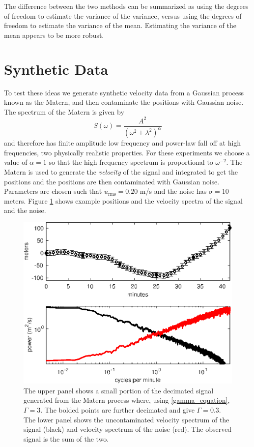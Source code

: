 \documentclass[twocol]{ametsoc}
\begin{document}
The difference between the two methods can be summarized as using the degrees of freedom to estimate the variance of the variance, versus using the degrees of freedom to estimate the variance of the mean. Estimating the variance of the mean appears to be more robust.

%
\section{Synthetic Data}
%

To test these ideas we generate synthetic velocity data from a Gaussian process known as the Matern, and then contaminate the positions with Gaussian noise. The spectrum of the Matern is given by
\begin{equation}
S(\omega) = \frac{A^2}{(\omega^2 + \lambda^2)^\alpha}
\end{equation}
and therefore has finite amplitude low frequency and power-law fall off at high frequencies, two physically realistic properties. For these experiments we choose a value of $\alpha=1$ so that the high frequency spectrum is proportional to $\omega^{-2}$. The Matern is used to generate the \emph{velocity} of the signal and integrated to get the positions and the positions are then contaminated with Gaussian noise. Parameters are chosen such that $u_{\textrm{rms}}=0.20$ m/s and the noise has $\sigma=10$ meters. Figure \ref{synthetic_process_and_spectrum} shows example positions and the velocity spectra of the signal and the noise.

\begin{figure}[t]
  \centerline{\includegraphics[width=33pc,angle=0]{synthetic_process_and_spectrum}}
  
  \caption{The upper panel shows a small portion of the decimated signal generated from the Matern process where, using \ref{gamma_equation}, $\Gamma = 3$. The bolded points are further decimated and give $\Gamma=0.3$. The lower panel shows the uncontaminated velocity spectrum of the signal (black) and velocity spectrum of the noise (red). The observed signal is the sum of the two. }
  \label{synthetic_process_and_spectrum}
\end{figure}
\end{document}
